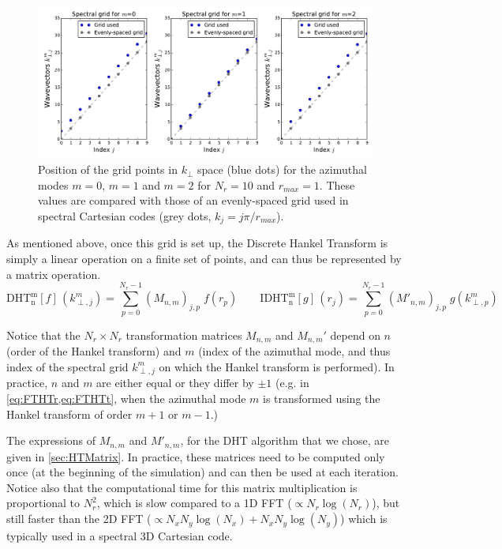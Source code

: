 \documentclass[1p,times,authoryear]{elsarticle}
\begin{document}
\begin{figure}[!h]
\includegraphics[width=\textwidth]{figures/KGrid.pdf}
\caption{\label{fig:Kgrid}Position of the grid points in $k_\perp$ space
  (blue dots) for the azimuthal modes $m=0$, $m=1$ and $m=2$ for $N_r
  = 10$ and $r_{max}=1$. These values are compared with those of an
  evenly-spaced grid used in spectral Cartesian codes (grey dots, $k_j = j\pi/r_{max}$).}
\end{figure}

As mentioned above, once this grid is set up, the Discrete Hankel Transform is simply a
linear operation on a finite set of points, and can thus be
represented by a matrix operation.
\[ \mathrm{DHT^m_n}[f] \,(k^m_{\perp,j}) = \sum_{p=0}^{N_r-1} (M_{n,m})_{j,p}
\;f(r_p) \qquad \mathrm{IDHT^m_n}[g] \, (r_j) = \sum_{p=0}^{N_r-1}
(M'_{n,m})_{j,p} \; g(k^m_{\perp,p}) \]

Notice that the $N_r\times N_r$ transformation matrices $M_{n,m}$ and
$M_{n,m}'$ depend on $n$ (order of the Hankel transform) and $m$
(index of the azimuthal mode, and thus index of the spectral grid
$k^m_{\perp,j}$ on which the Hankel transform is performed). 
In practice, $n$ and $m$ are either equal or they differ by
$\pm 1$ (e.g. in \cref{eq:FTHTr,eq:FTHTt}, when the azimuthal mode $m$ is
transformed using the Hankel transform of order $m+1$ or $m-1$.)

The expressions of $M_{n,m}$ and $M'_{n,m}$, for the DHT algorithm
that we chose, are given in \ref{sec:HTMatrix}. 
In practice,  these matrices need to be
computed only once (at the beginning of the simulation) and can then be used at each
iteration. Notice also that the computational time for this
matrix multiplication is proportional to $N_r^2$, which is slow
compared to a 1D FFT ($\propto N_r \log(N_r)$), but
still faster than the 2D FFT ($\propto N_x N_y \log(N_x) + N_x N_y \log(N_y) $)
which is typically used in a spectral 3D Cartesian code. 
\end{document}
